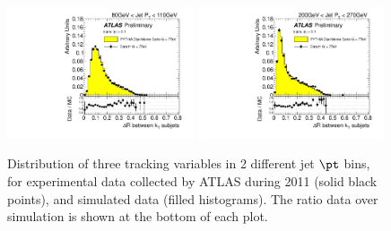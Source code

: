 \begin{figure}[tp]
\includegraphics[width=0.49\textwidth]{FIGS/dataMC/FullDataVarDRktaxisPT080.pdf}
\includegraphics[width=0.49\textwidth]{FIGS/dataMC/FullDataVarDRktaxisPT200.pdf}  
\caption{ Distribution of three tracking variables in 2 different jet $\pt$ bins, for experimental data  collected by ATLAS during 2011 (solid black points), and simulated data (filled histograms). The ratio data over simulation is shown at the bottom of each plot.}
\label{fig:datamcinputvars}
\end{figure}

